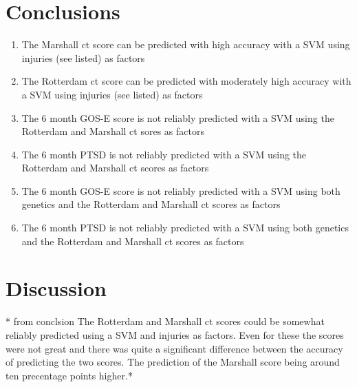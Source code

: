 \documentclass[11pt]{article}
\begin{document}
\section{Conclusions}

\begin{enumerate}
  \item{The Marshall \gls{ct} score can be predicted with high accuracy with a SVM using injuries (see listed) as factors}
  \item{The Rotterdam \gls{ct} score can be predicted with moderately high accuracy with a SVM using injuries (see listed) as factors}
  \item{The 6 month GOS-E score is not reliably predicted with a SVM using the Rotterdam and Marshall \gls{ct} sores as factors}
  \item{The 6 month PTSD is not reliably predicted with a SVM using the Rotterdam and Marshall \gls{ct} scores as factors}
  \item{The 6 month GOS-E score is not reliably predicted with a SVM using both genetics and the Rotterdam and Marshall \gls{ct} scores as factors}
  \item{The 6 month PTSD is not reliably predicted with a SVM using both genetics and the Rotterdam and Marshall \gls{ct} scores as factors}
\end{enumerate}
\section{Discussion}
* from conclsion
The Rotterdam and Marshall \gls{ct} scores could be somewhat reliably predicted using a SVM and injuries as factors. Even for these the scores were not great and there was quite a significant difference between the accuracy of predicting the two scores. The prediction of the Marshall score being around ten precentage points higher.*\\
\\
\end{document}
